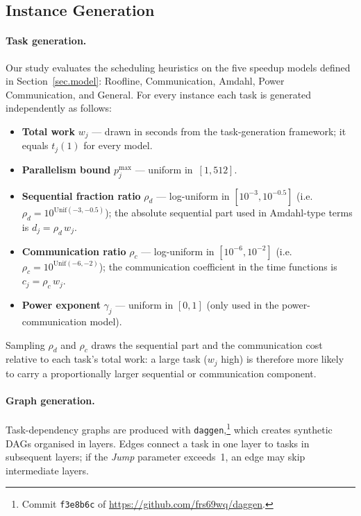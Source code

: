 \documentclass{article}
\begin{document}
\subsection{Instance Generation}
\label{sec:instance-gen}
\paragraph{Task generation.}
Our study evaluates the scheduling heuristics on the five speedup models
defined in Section~\ref{sec.model}:
Roofline, Communication, Amdahl, Power Communication, and General.
For every instance each task is generated independently as follows:

\begin{itemize}
    \item \textbf{Total work} \(w_j\) — drawn in seconds from the
          task-generation framework; it equals \(t_j(1)\) for every model.
    \item \textbf{Parallelism bound} \(p_j^{\max}\) — uniform in $\,[1,512]$.
    \item \textbf{Sequential fraction ratio} $\rho_d$
          — log-uniform in $[10^{-3},10^{-0.5}]$
          (i.e.\ $\rho_d = 10^{\mathrm{Unif}(-3,-0.5)}$);  
          the absolute sequential part used in Amdahl-type terms is
          \(d_j = \rho_d \, w_j\).
    \item \textbf{Communication ratio} $\rho_c$
          — log-uniform in $[10^{-6},10^{-2}]$
          (i.e.\ $\rho_c = 10^{\mathrm{Unif}(-6,-2)}$);  
          the communication coefficient in the time functions is
          \(c_j = \rho_c \, w_j\).
    \item \textbf{Power exponent} $\gamma_j$ — uniform in $[0,1]$
          (only used in the power-communication model).
\end{itemize}

\noindent
Sampling $\rho_d$ and $\rho_c$ draws the
sequential part and the communication cost relative to each task’s
total work: a large task ($w_j$ high) is therefore more likely to carry a
proportionally larger sequential or communication component.



\paragraph{Graph generation.}
Task-dependency graphs are produced with \texttt{daggen},\footnote{Commit
\texttt{f3e8b6c} of
\url{https://github.com/frs69wq/daggen}.}
which creates synthetic DAGs organised in layers.
Edges connect a task in one layer to tasks in subsequent layers; if the
\textit{Jump} parameter exceeds~1, an edge may skip intermediate layers.
\end{document}
